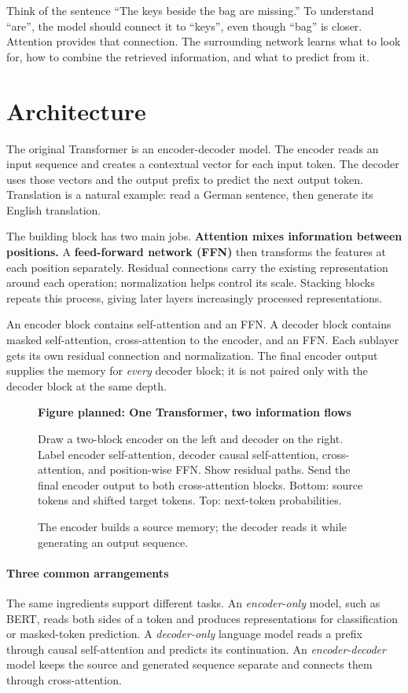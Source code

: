 \documentclass[11pt, oneside]{book}
\let\originalsection\section
\renewcommand{\section}{\Needspace{7\baselineskip}\originalsection}
\newcommand{\figureplaceholder}[5]{%
\begin{figure}[htbp]
\centering
\begin{tcolorbox}[unbreakable,width=\linewidth,height=#1,colback=accent!3,
  colframe=accent!30,boxrule=0.5pt,arc=2.5mm,sharp corners=all,
  valign=center,halign=center,fontupper=\small]
{\bfseries\color{accent}Figure planned: #2}\par\medskip
{\color{gray!75!black}#3}
\end{tcolorbox}
\caption{#4}\label{#5}
\end{figure}}
\begin{document}
Think of the sentence ``The keys beside the bag are missing.'' To understand ``are'', the model should connect it to ``keys'', even though ``bag'' is closer. Attention provides that connection. The surrounding network learns what to look for, how to combine the retrieved information, and what to predict from it.

\section{Architecture}\label{sec:source-5-1}
The original Transformer is an encoder-decoder model. The encoder reads an input sequence and creates a contextual vector for each input token. The decoder uses those vectors and the output prefix to predict the next output token. Translation is a natural example: read a German sentence, then generate its English translation.

The building block has two main jobs. \textbf{Attention mixes information between positions.} A \textbf{feed-forward network (FFN)} then transforms the features at each position separately. Residual connections carry the existing representation around each operation; normalization helps control its scale. Stacking blocks repeats this process, giving later layers increasingly processed representations.

An encoder block contains self-attention and an FFN. A decoder block contains masked self-attention, cross-attention to the encoder, and an FFN. Each sublayer gets its own residual connection and normalization. The final encoder output supplies the memory for \emph{every} decoder block; it is not paired only with the decoder block at the same depth.

\figureplaceholder{4.5cm}{One Transformer, two information flows}{Draw a two-block encoder on the left and decoder on the right. Label encoder self-attention, decoder causal self-attention, cross-attention, and position-wise FFN. Show residual paths. Send the final encoder output to both cross-attention blocks. Bottom: source tokens and shifted target tokens. Top: next-token probabilities.}{The encoder builds a source memory; the decoder reads it while generating an output sequence.}{fig:transformer-overview}

\paragraph{Three common arrangements} The same ingredients support different tasks. An \emph{encoder-only} model, such as BERT, reads both sides of a token and produces representations for classification or masked-token prediction. A \emph{decoder-only} language model reads a prefix through causal self-attention and predicts its continuation. An \emph{encoder-decoder} model keeps the source and generated sequence separate and connects them through cross-attention.
\end{document}
